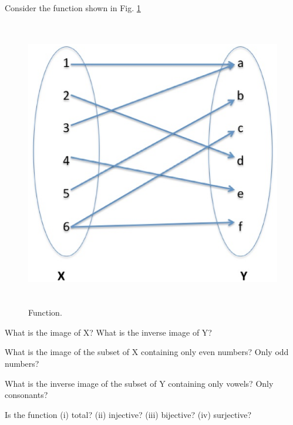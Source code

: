 \documentclass[handout]{mcs}
\begin{document}


\begin{problem}
Consider the function shown in Fig. \ref{fig:img} 

\begin{figure}[h]

\includegraphics[height = 5in ]{image-inverseimage1}

\caption{Function.}
\label{fig:img}
\end{figure}
\bparts
\ppart What is the image of X? What is the inverse image of Y?

\ppart What is the image of the subset of X containing only even numbers? Only odd numbers?

\ppart What is the inverse image of the subset of Y containing only vowels? Only consonants?

\ppart Is the function (i) total? (ii) injective? (iii) bijective? (iv) surjective?

\end{problem}

\end{document}
